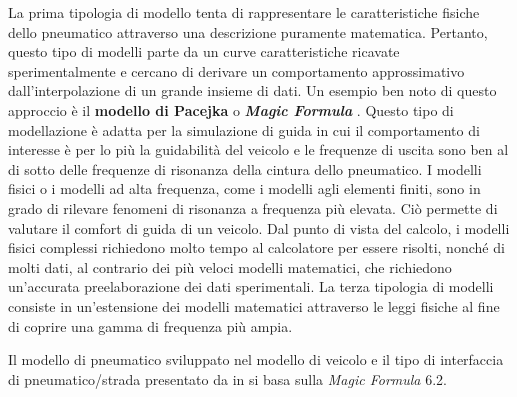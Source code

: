 La prima tipologia di modello tenta di rappresentare le caratteristiche fisiche dello pneumatico attraverso una descrizione puramente matematica. Pertanto, questo tipo di modelli parte da un curve caratteristiche ricavate sperimentalmente e cercano di derivare un comportamento approssimativo dall'interpolazione di un grande insieme di dati. Un esempio ben noto di questo approccio è il \textbf{modello di Pacejka} o \textbf{\textit{Magic Formula}} \cite{hans}. Questo tipo di modellazione è adatta per la simulazione di guida in cui il comportamento di interesse è per lo più la guidabilità del veicolo e le frequenze di uscita sono ben al di sotto delle frequenze di risonanza della cintura dello pneumatico. I modelli fisici o i modelli ad alta frequenza, come i modelli agli elementi finiti, sono in grado di rilevare fenomeni di risonanza a frequenza più elevata. Ciò permette di valutare il comfort di guida di un veicolo. Dal punto di vista del calcolo, i modelli fisici complessi richiedono molto tempo al calcolatore per essere risolti, nonché di molti dati, al contrario dei più veloci modelli matematici, che richiedono un'accurata preelaborazione dei dati sperimentali. La terza tipologia di modelli consiste in un'estensione dei modelli matematici attraverso le leggi fisiche al fine di coprire una gamma di frequenza più ampia.

Il modello di pneumatico sviluppato nel modello di veicolo e il tipo di interfaccia di pneumatico/strada presentato da \citeauthor{Larcher} in \cite{Larcher} si basa sulla \textit{Magic Formula} 6.2.
%
